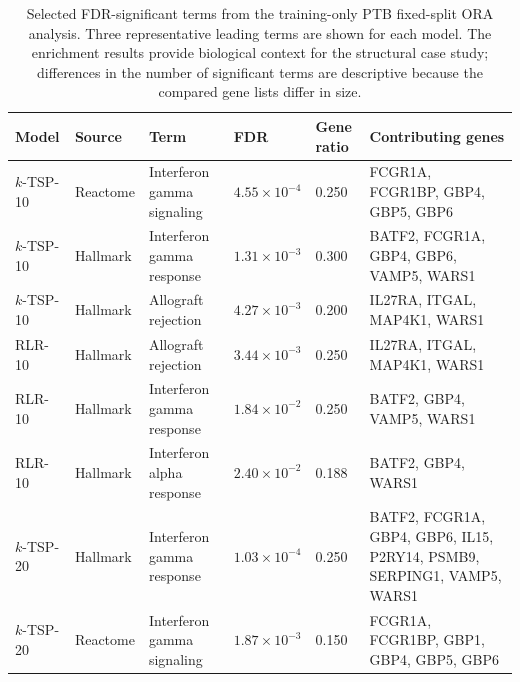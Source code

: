 \documentclass[11pt, a4paper]{article}
\begin{document}
\begin{table}[!htbp]
\centering
\caption{Selected FDR-significant terms from the training-only PTB fixed-split ORA analysis. Three representative leading terms are shown for each model. The enrichment results provide biological context for the structural case study; differences in the number of significant terms are descriptive because the compared gene lists differ in size.}
\label{tab:ptb_ora_top_terms}
{\scriptsize
\setlength{\tabcolsep}{3pt}
\renewcommand{\arraystretch}{1.15}
\begin{adjustbox}{max width=\linewidth}
\begin{tabular}{
L{0.11\textwidth}
L{0.08\textwidth}
L{0.21\textwidth}
C{0.095\textwidth}
C{0.07\textwidth}
L{0.28\textwidth}}
\toprule
\textbf{Model} &
\textbf{Source} &
\textbf{Term} &
\textbf{FDR} &
\textbf{Gene ratio} &
\textbf{Contributing genes} \\
\midrule

$k$-TSP-10
& Reactome
& Interferon gamma signaling
& $4.55\times10^{-4}$
& 0.250
& FCGR1A, FCGR1BP, GBP4, GBP5, GBP6 \\

$k$-TSP-10
& Hallmark
& Interferon gamma response
& $1.31\times10^{-3}$
& 0.300
& BATF2, FCGR1A, GBP4, GBP6, VAMP5, WARS1 \\

$k$-TSP-10
& Hallmark
& Allograft rejection
& $4.27\times10^{-3}$
& 0.200
& IL27RA, ITGAL, MAP4K1, WARS1 \\

\midrule

RLR-10
& Hallmark
& Allograft rejection
& $3.44\times10^{-3}$
& 0.250
& IL27RA, ITGAL, MAP4K1, WARS1 \\

RLR-10
& Hallmark
& Interferon gamma response
& $1.84\times10^{-2}$
& 0.250
& BATF2, GBP4, VAMP5, WARS1 \\

RLR-10
& Hallmark
& Interferon alpha response
& $2.40\times10^{-2}$
& 0.188
& BATF2, GBP4, WARS1 \\

\midrule

$k$-TSP-20
& Hallmark
& Interferon gamma response
& $1.03\times10^{-4}$
& 0.250
& BATF2, FCGR1A, GBP4, GBP6, IL15, P2RY14, PSMB9, SERPING1, VAMP5, WARS1 \\

$k$-TSP-20
& Reactome
& Interferon gamma signaling
& $1.87\times10^{-3}$
& 0.150
& FCGR1A, FCGR1BP, GBP1, GBP4, GBP5, GBP6 \\


\end{tabular}
\end{adjustbox}}
\end{table}
\end{document}

